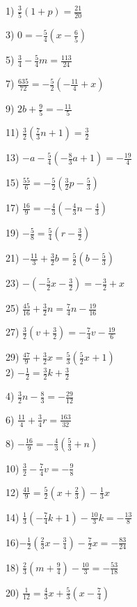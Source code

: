 \begin{multicols}{2}
  1) $\frac{3}{5} (1 + p) = \frac{21}{20}$
  
  3) $0 = - \frac{5}{4} (x - \frac{6}{5})$
  
  5) $\frac{3}{4} - \frac{5}{4} m = \frac{113}{24}$
  
  7) $\frac{635}{72} = - \frac{5}{2} (- \frac{11}{4} + x)$
  
  9) $2 b + \frac{9}{5} = - \frac{11}{5}$
  
  11) $\frac{3}{2} (\frac{7}{3} n + 1) = \frac{3}{2}$
  
  13) $- a - \frac{5}{4} (- \frac{8}{3} a + 1) = - \frac{19}{4}$
  
  15) $\frac{55}{6} = - \frac{5}{2} (\frac{3}{2} p - \frac{5}{3})$
  
  17) $\frac{16}{9} = - \frac{4}{3} (- \frac{4}{3} n - \frac{4}{3})$
  
  19) $- \frac{5}{8} = \frac{5}{4} (r - \frac{3}{2})$
  
  21) $- \frac{11}{3} + \frac{3}{2} b = \frac{5}{2} (b - \frac{5}{3})$
  
  23) $- (- \frac{5}{2} x - \frac{3}{2}) = - \frac{3}{2} + x$
  
  25) $\frac{45}{16} + \frac{3}{2} n = \frac{7}{4} n - \frac{19}{16}$
  
  27) $\frac{3}{2} (v + \frac{3}{2}) = - \frac{7}{4} v - \frac{19}{6}$
  
  29) $\frac{47}{9} + \frac{3}{2} x = \frac{5}{3} (\frac{5}{2} x_{} + 1)$\\
  
  2) $- \frac{1}{2} = \frac{3}{2} k + \frac{3}{2}$
  
  4) $\frac{3}{2} n - \frac{8}{3} = - \frac{29}{12}$
  
  6) $\frac{11}{4} + \frac{3}{4} r = \frac{163}{32}$
  
  8) $- \frac{16}{9} = - \frac{4}{3} (\frac{5}{3} + n)$
  
  10) $\frac{3}{2} - \frac{7}{4} v = - \frac{9}{8}$
  
  12) $\frac{41}{9} = \frac{5}{2} (x + \frac{2}{3}) - \frac{1}{3} x$
  
  14) $\frac{1}{3} (- \frac{7}{4} k + 1) - \frac{10}{3} k = - \frac{13}{8}$
  
  16)$- \frac{1}{2} (\frac{2}{3} x - \frac{3}{4}) - \frac{7}{2} x = -
  \frac{83}{24}$
  
  18) $\frac{2}{3} (m + \frac{9}{4}) - \frac{10}{3} = - \frac{53}{18}$
  
  20) $\frac{1}{12} = \frac{4}{3} x + \frac{5}{3} (x - \frac{7}{4})$
  

\end{multicols}
